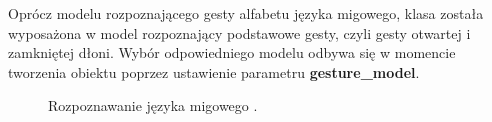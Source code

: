 \quad Oprócz modelu rozpoznającego gesty alfabetu języka migowego, klasa została wyposażona w model rozpoznający podstawowe gesty, czyli gesty otwartej i zamkniętej dłoni. Wybór odpowiedniego modelu odbywa się w momencie tworzenia obiektu poprzez ustawienie parametru \textbf{gesture\_model}.


\begin{figure}[H]
    \centering
    \hfill
    \hfill
    \caption{Rozpoznawanie języka migowego .}
\end{figure}


